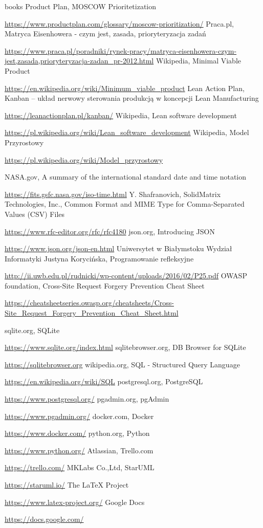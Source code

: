\documentclass[a4paper,10pt, twoside]{report}
\begin{document}
\begin{large}
\begin{thebibliography} {books}
     Product Plan, MOSCOW Prioritetization \raggedright\url{
        https://www.productplan.com/glossary/moscow-prioritization/}
    Praca.pl, Matryca Eisenhowera - czym jest, zasada, prioryteryzacja zadań \raggedright\url{
        https://www.praca.pl/poradniki/rynek-pracy/matryca-eisenhowera-czym-jest,zasada,prioryteryzacja-zadan_pr-2012.html}
     Wikipedia, Minimal Viable Product \raggedright\url{
        https://en.wikipedia.org/wiki/Minimum_viable_product}
     Lean Action Plan, Kanban – układ nerwowy sterowania produkcją w koncepcji Lean Manufacturing \raggedright\url{
        https://leanactionplan.pl/kanban/}
     Wikipedia, Lean software development \raggedright\url{
        https://pl.wikipedia.org/wiki/Lean_software_development}
     Wikipedia, Model Przyrostowy \raggedright\url{
        https://pl.wikipedia.org/wiki/Model_przyrostowy}
    
     NASA.gov, A summary of the international standard date and time notation \raggedright\url{
        https://fits.gsfc.nasa.gov/iso-time.html}
     Y. Shafranovich, SolidMatrix Technologies, Inc., Common Format and MIME Type for Comma-Separated Values (CSV) Files \raggedright\url{
        https://www.rfc-editor.org/rfc/rfc4180}
     json.org, Introducing JSON \raggedright\url{
        https://www.json.org/json-en.html}
     Uniwersytet w Białymstoku Wydział Informatyki Justyna Korycińska, Programowanie refleksyjne \raggedright\url{
        http://ii.uwb.edu.pl/rudnicki/wp-content/uploads/2016/02/P25.pdf}
     OWASP foundation, Cross-Site Request Forgery Prevention Cheat Sheet \raggedright\url{
        https://cheatsheetseries.owasp.org/cheatsheets/Cross-Site_Request_Forgery_Prevention_Cheat_Sheet.html}
        
     sqlite.org, SQLite \raggedright\url{
        https://www.sqlite.org/index.html}
     sqlitebrowser.org, DB Browser for SQLite \raggedright\url{
        https://sqlitebrowser.org}
     wikipedia.org, SQL - Structured Query Language \raggedright\url{
        https://en.wikipedia.org/wiki/SQL}
     postgresql.org, PostgreSQL \raggedright\url{
        https://www.postgresql.org/}
     pgadmin.org, pgAdmin \raggedright\url{
        https://www.pgadmin.org/}
     docker.com, Docker \raggedright\url{
        https://www.docker.com/}
     python.org, Python \raggedright\url{
        https://www.python.org/}
     Atlassian, Trello.com \raggedright\url{
        https://trello.com/}
     MKLabs Co.,Ltd, StarUML \raggedright\url{
        https://staruml.io/}
     The LaTeX Project \raggedright\url{
        https://www.latex-project.org/}
     Google Docs \raggedright\url{
        https://docs.google.com/}
        

\end{thebibliography}
\end{large}
\end{document}
